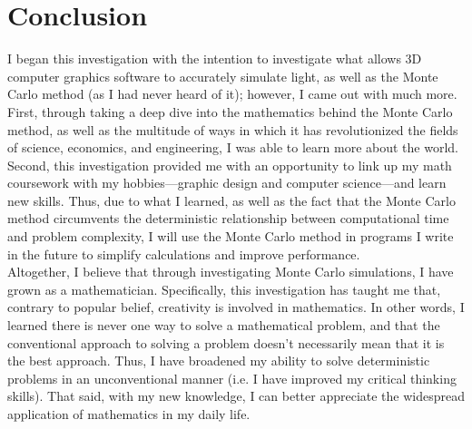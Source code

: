 \documentclass[11pt]{article}
\begin{document}
\section{Conclusion}
I began this investigation with the intention to investigate what allows 3D computer graphics software to accurately simulate light, as well as the Monte Carlo method (as I had never heard of it); however, I came out with much more. First, through taking a deep dive into the mathematics behind the Monte Carlo method, as well as the multitude of ways in which it has revolutionized the fields of science, economics, and engineering, I was able to learn more about the world. Second, this investigation provided me with an opportunity to link up my math coursework with my hobbies—graphic design and computer science—and learn new skills. Thus, due to what I learned, as well as the fact that the Monte Carlo method circumvents the deterministic relationship between computational time and problem complexity, I will use the Monte Carlo method in programs I write in the future to simplify calculations and improve performance.\\[3ex]

Altogether, I believe that through investigating Monte Carlo simulations, I have grown as a mathematician. Specifically, this investigation has taught me that, contrary to popular belief, creativity is involved in mathematics. In other words, I learned there is never one way to solve a mathematical problem, and that the conventional approach to solving a problem doesn't necessarily mean that it is the best approach. Thus, I have broadened my ability to solve deterministic problems in an unconventional manner (i.e. I have improved my critical thinking skills). That said, with my new knowledge, I can better appreciate the widespread application of mathematics in my daily life.


\newpage
\end{document}
